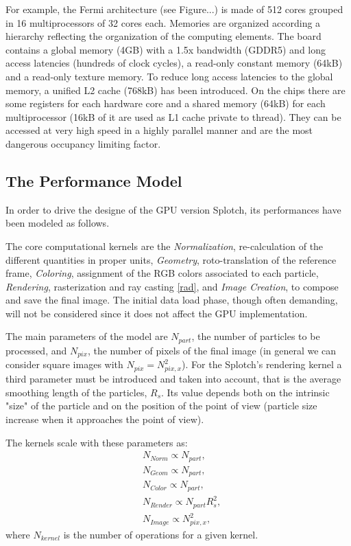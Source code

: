 \documentclass[11pt]{article}
\begin{document}
For example, the Fermi architecture (see Figure...) is made of 512 cores grouped in 16 multiprocessors of 32 cores each. Memories are organized according a hierarchy reflecting the organization of the computing elements. The board contains a global memory (4GB) with a 1.5x bandwidth (GDDR5) and long access latencies (hundreds of clock cycles), a read-only constant memory (64kB) and a read-only texture memory. To reduce long access latencies to the global memory, a unified L2 cache (768kB) has been introduced. On the chips there are some registers for each hardware core and a shared memory (64kB) for each multiprocessor (16kB of it are used as L1 cache private to thread). They can be accessed at very high speed in a highly parallel manner and are the most dangerous occupancy limiting factor.
 

\subsection{The Performance Model}

In order to drive the designe of the GPU version Splotch, its performances have been modeled
as follows.

The core computational kernels are the {\it Normalization}, re-calculation
of the different quantities in proper units, {\it Geometry}, roto-translation 
of the reference frame, {\it Coloring}, assignment of the RGB colors associated to each 
particle,  {\it Rendering},
rasterization and ray casting \eqref{rad}, 
and {\it Image Creation}, to compose and save 
the final image. The initial data load phase, though often demanding, will not be considered
since it does not affect the GPU implementation.

The main parameters of the model are $N_{part}$, the number of particles
to be processed, and $N_{pix}$, the number of pixels of the final image
(in general we can consider square images with $N_{pix}=N_{pix,x}^2$). For 
the Splotch's rendering kernel a third parameter must be introduced and
taken into account, that is the average smoothing length of the particles,
$R_s$. Its value depends both on the intrinsic "size" of the particle
and on the position of the point of view (particle size increase when it approaches 
the point of view).

The kernels scale with these parameters as:
\begin{align}\label{scaling}
& N_{Norm} \propto N_{part},\\
& N_{Geom} \propto N_{part},\\
& N_{Color} \propto N_{part},\\
& N_{Render} \propto N_{part} R_s^2,\\
& N_{Image} \propto N_{pix,x}^2,
\end{align}
where $N_{kernel}$ is the number of operations for a given kernel.
\end{document}

